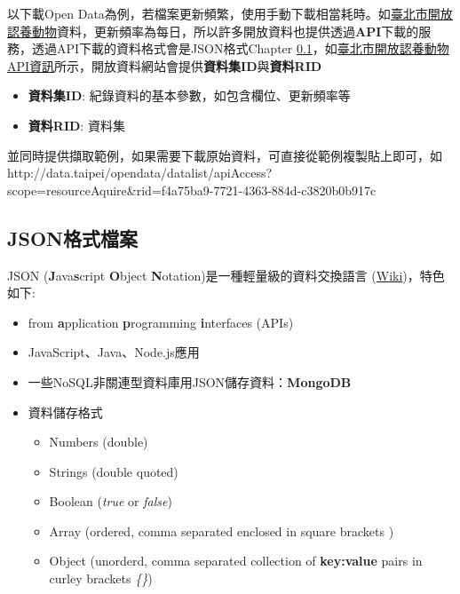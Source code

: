 \documentclass[]{book}
\providecommand{\tightlist}{%
  \setlength{\itemsep}{0pt}\setlength{\parskip}{0pt}}
\theoremstyle{definition}
\theoremstyle{definition}
\theoremstyle{remark}
\begin{document}
以下載Open
Data為例，若檔案更新頻繁，使用手動下載相當耗時。如\href{http://data.taipei/opendata/datalist/datasetMeta?oid=6a3e862a-e1cb-4e44-b989-d35609559463}{臺北市開放認養動物}資料，更新頻率為每日，所以許多開放資料也提供透過\textbf{API}下載的服務，透過API下載的資料格式會是JSON格式Chapter
\ref{json}，如\href{http://data.taipei/opendata/datalist/datasetMeta/outboundDesc?id=6a3e862a-e1cb-4e44-b989-d35609559463\&rid=f4a75ba9-7721-4363-884d-c3820b0b917c}{臺北市開放認養動物API資訊}所示，開放資料網站會提供\textbf{資料集ID}與\textbf{資料RID}

\begin{itemize}
\tightlist
\item
  \textbf{資料集ID}: 紀錄資料的基本參數，如包含欄位、更新頻率等
\item
  \textbf{資料RID}: 資料集
\end{itemize}

並同時提供擷取範例，如果需要下載原始資料，可直接從範例複製貼上即可，如http://data.taipei/opendata/datalist/apiAccess?scope=resourceAquire\&rid=f4a75ba9-7721-4363-884d-c3820b0b917c

\subsection{JSON格式檔案}\label{json}

JSON (\textbf{J}ava\textbf{s}cript \textbf{O}bject
\textbf{N}otation)是一種輕量級的資料交換語言
(\href{http://en.wikipedia.org/wiki/JSON}{Wiki})，特色如下:

\begin{itemize}
\tightlist
\item
  from \textbf{a}pplication \textbf{p}rogramming \textbf{i}nterfaces
  (APIs)
\item
  JavaScript、Java、Node.js應用
\item
  一些NoSQL非關連型資料庫用JSON儲存資料：\textbf{MongoDB}
\item
  資料儲存格式

  \begin{itemize}
  \tightlist
  \item
    Numbers (double)
  \item
    Strings (double quoted)
  \item
    Boolean (\emph{true} or \emph{false})
  \item
    Array (ordered, comma separated enclosed in square brackets
    \emph{\protect\hyperlink{preface}{}})
  \item
    Object (unorderd, comma separated collection of \textbf{key:value}
    pairs in curley brackets \emph{\{\}})
  \end{itemize}
\end{itemize}
\end{document}
